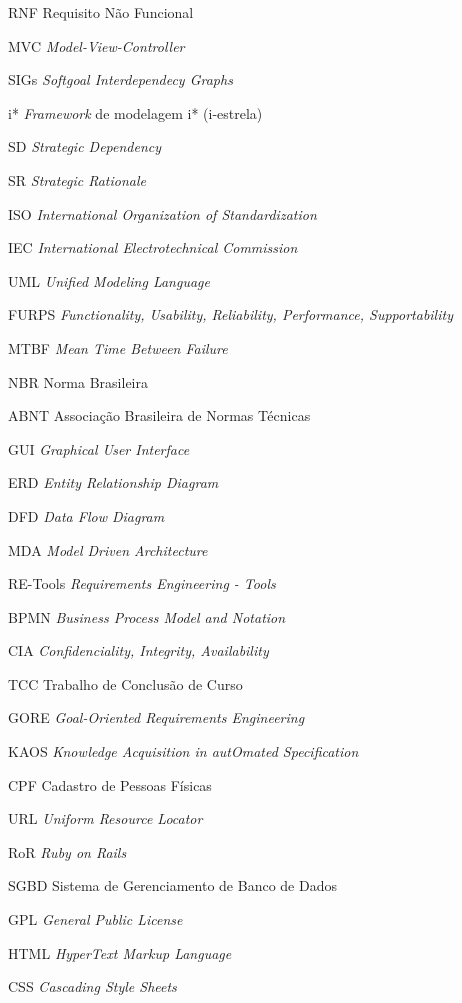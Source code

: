\begin{siglas}
  \item[RNF] Requisito Não Funcional
  \item[MVC] \textit{Model-View-Controller}
  \item[SIGs] \textit{Softgoal Interdependecy Graphs}
  \item[i*] \textit{Framework} de modelagem i* (i-estrela)
  \item[SD] \textit{Strategic Dependency}
  \item[SR] \textit{Strategic Rationale}
  \item[ISO] \textit{International Organization of Standardization}
  \item[IEC] \textit{International Electrotechnical Commission}
  \item[UML] \textit{Unified Modeling Language}
  \item[FURPS] \textit{Functionality, Usability, Reliability, Performance, Supportability}
  \item[MTBF] \textit{Mean Time Between Failure}
  \item[NBR] Norma Brasileira
  \item[ABNT] Associação Brasileira de Normas Técnicas
  \item[GUI] \textit{Graphical User Interface}
  \item[ERD] \textit{Entity Relationship Diagram}
  \item[DFD] \textit{Data Flow Diagram}
  \item[MDA] \textit{Model Driven Architecture}
  \item[RE-Tools] \textit{Requirements Engineering - Tools}
  \item[BPMN] \textit{Business Process Model and Notation}
  \item[CIA] \textit{Confidenciality, Integrity, Availability}
  \item[TCC] Trabalho de Conclusão de Curso
  \item[GORE] \textit{Goal-Oriented Requirements Engineering}
  \item[KAOS] \textit{Knowledge Acquisition in autOmated Specification}
  \item[CPF] Cadastro de Pessoas Físicas
  \item[URL] \textit{Uniform Resource Locator}
  \item[RoR] \textit{Ruby on Rails}
  \item[SGBD] Sistema de Gerenciamento de Banco de Dados
  \item[GPL] \textit{General Public License}
  \item[HTML] \textit{HyperText Markup Language}
  \item[CSS] \textit{Cascading Style Sheets}
\end{siglas}
